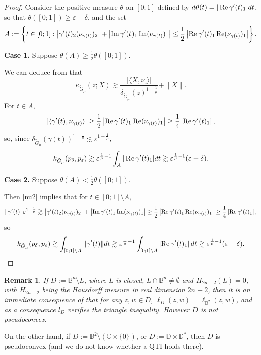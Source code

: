 \documentclass[a4paper,12pt]{amsart}
\def\B{\mathbb B}
\def\D{\mathbb D}
\def\C{\mathbb C}
\newtheorem{rem}[thm]{Remark}
\renewcommand{\Im}{\operatorname{\rm{Im}}}
\renewcommand{\Re}{\operatorname{\rm{Re}}}
\newcommand{\eps}{\varepsilon}
\begin{document}
\begin{proof}
Consider the positive
measure $\theta$ on $[0;1]$ defined by $d\theta(t)= |\Re \gamma'(t)_1| dt$,
so that $\theta([0;1])\ge \eps-\delta$,
and the set
\[
A:= \left\{ t\in [0;1]:
\left| \gamma'(t)_2 (\nu_{\gamma(t)})_2 \right| + \left| \Im \gamma'(t)_1 \Im (\nu_{\gamma(t)})_1 \right|
\le \frac{1}{2} \left| \Re \gamma'(t)_1 \Re (\nu_{\gamma(t)})_1 \right|
\right\} .
\]

{\bf Case 1.} Suppose $\theta(A) \ge \frac{1}{2}\theta([0;1])$.

We can deduce from \cite[Proposition 2.3]{Fu2} that
\[
\kappa_{\tilde G_\mu} (z; X) \gtrsim \frac{|\langle X, \nu_z \rangle|}{\delta_{\tilde G_\mu}(z)^{1-\frac1\mu}} + \|X\|.
\]
For $t\in A$,
\[
|\langle \gamma'(t), \nu_{\gamma(t)} \rangle|
\ge \frac{1}{2} \left| \Re \gamma'(t)_1 \Re (\nu_{\gamma(t)})_1 \right|
\ge \frac{1}{4} \left| \Re \gamma'(t)_1 \right| ,\]
so, since $\delta_{\tilde G_\mu}(\gamma(t))^{1-\frac1\mu}\lesssim \eps^{1-\frac1\mu}$,
\[
k_{\tilde G_\mu}(p_\delta, p_\eps) \gtrsim \eps^{\frac1\mu -1} \int_A | \Re \gamma'(t)_1| dt \gtrsim \eps^{\frac1\mu -1} (\eps-\delta).
\]

{\bf Case 2.} Suppose $\theta(A) < \frac{1}{2}\theta([0;1])$.

Then \eqref{nu2} implies that for $t\in [0;1]\setminus A$,
\[
\|\gamma'(t) \|  \eps^{1- \frac1\mu } \gtrsim
\left| \gamma'(t)_2 (\nu_{\gamma(t)})_2 \right| + \left| \Im \gamma'(t)_1 \Im (\nu_{\gamma(t)})_1 \right|
\ge \frac{1}{2} \left|\Re \gamma'(t)_1 \Re (\nu_{\gamma(t)})_1 \right|
\ge \frac{1}{4} \left| \Re \gamma'(t)_1  \right| ,
\]
so
\[
k_{\tilde G_\mu}(p_\delta, p_\eps) \gtrsim
\int_{[0;1]\setminus A} \|\gamma'(t) \| dt
\gtrsim
\eps^{\frac1\mu -1} \int_{[0;1]\setminus A}\left| \Re \gamma'(t)_1  \right| dt
\gtrsim \eps^{\frac1\mu -1}  (\eps-\delta).
\]
\end{proof}

\begin{rem}
\label{avoid}
If $D:= \B^n \setminus L$, where $L$ is closed, $L\cap\B^n\neq\emptyset$ and $H_{2n-2}(L)=0$, with $H_{2n-2}$ being the Hausdorff measure in real
dimension $2n-2$, then it is an immediate consequence of \cite[Theorem 3.4.2]{JP}
that  for any $z,w \in D$, $\ell_D (z,w)=\ell_{\B^2}(z,w)$,
and as a consequence $l_D$ verifies the triangle inequality. However $D$ is not pseudoconvex.
\end{rem}

On the other hand, if $D:= \B^2 \setminus (\C\times \{0\})$, or  $D:=\D \times \D^*$, then $D$ is pseudoconvex
(and we do not know whether a QTI holds there).  
\end{document}
